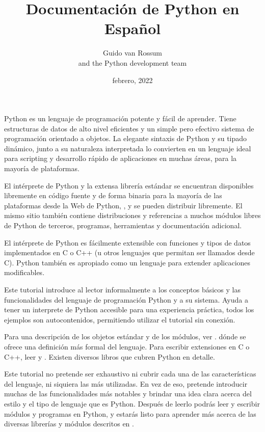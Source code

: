 \documentclass[a4,10pt,spanish]{sphinxmanual}
\title{Documentación de Python en Español}
\date{febrero, 2022}
\author{Guido van Rossum\\and the Python development team}
\begin{document}
\pagestyle{empty}
\sphinxmaketitle
\pagestyle{plain}
\sphinxtableofcontents
\pagestyle{normal}
\label{\detokenize{tutorial/index::doc}}


\sphinxAtStartPar
Python es un lenguaje de programación potente y fácil de aprender. Tiene estructuras de datos de alto nivel eficientes y un simple pero efectivo sistema de programación orientado a objetos. La elegante sintaxis de Python y su tipado dinámico, junto a su naturaleza interpretada lo convierten en un lenguaje ideal para scripting y desarrollo rápido de aplicaciones en muchas áreas, para la mayoría de plataformas.

\sphinxAtStartPar
El intérprete de Python y la extensa librería estándar se encuentran disponibles libremente en código fuente y de forma binaria para la mayoría de las plataformas desde la Web de Python, , y se pueden distribuir libremente. El mismo sitio también contiene distribuciones y referencias a muchos módulos libres de Python de terceros, programas, herramientas y documentación adicional.

\sphinxAtStartPar
El intérprete de Python es fácilmente extensible con funciones y tipos de datos implementados en C o C++ (u otros lenguajes que permitan ser llamados desde C). Python también es apropiado como un lenguaje para extender aplicaciones modificables.

\sphinxAtStartPar
Este tutorial introduce al lector informalmente a los conceptos básicos y las funcionalidades del lenguaje de programación Python y a su sistema. Ayuda a tener un interprete de Python accesible para una experiencia práctica, todos los ejemplos son auto\sphinxhyphen{}contenidos, permitiendo utilizar el tutorial sin conexión.

\sphinxAtStartPar
Para una descripción de los objetos estándar y de los módulos, ver .  dónde se ofrece una definición más formal del lenguaje. Para escribir extensiones en C o C++, leer  y . Existen diversos libros que cubren Python en detalle.

\sphinxAtStartPar
Este tutorial no pretende ser exhaustivo ni cubrir cada una de las características del lenguaje, ni siquiera las más utilizadas. En vez de eso, pretende introducir muchas de las funcionalidades más notables y brindar una idea clara acerca del estilo y el tipo de lenguaje que es Python. Después de leerlo podrás leer y escribir módulos y programas en Python, y estarás listo para aprender más acerca de las diversas librerías y módulos descritos en .
\end{document}
